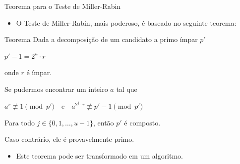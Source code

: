 \documentclass{beamer}
\begin{document}
\begin{frame}{Teorema para o Teste de Miller-Rabin}

\begin{itemize}
    \item O Teste de Miller-Rabin, mais poderoso, é baseado no seguinte teorema:
\end{itemize}

\begin{block}{Teorema}
    Dada a decomposição de um candidato a primo ímpar $p'$
    \vspace{-0.5em}
    \begin{center}
        $ p' - 1 = 2^u \cdot r $    
    \end{center}
    \vspace{-0.5em}
    onde $r$ é ímpar.

    Se pudermos encontrar um inteiro $a$ tal que
    \vspace{-0.5em}
    \begin{center}
        $a^r \not\equiv 1 \pmod{p'} \quad \text{e} \quad a^{2^j \cdot r} \not\equiv p' - 1 \pmod{p'}$
    \end{center}
    \vspace{-0.5em}
    Para todo $j \in \{0, 1, \dots, u-1\}$, então $p'$ é composto.

    Caso contrário, ele é provavelmente primo.
\end{block}

\begin{itemize}
    \item Este teorema pode ser transformado em um algoritmo.
\end{itemize}

\end{frame}
\end{document}
